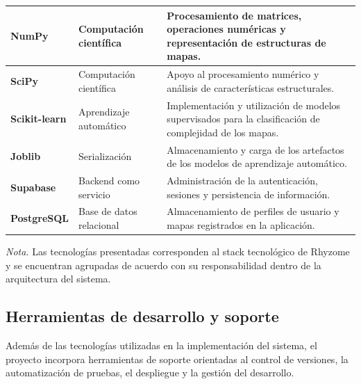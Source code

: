 \begin{table}[htbp]
\begin{tabularx}{\textwidth}{
			|>{\raggedright\arraybackslash}p{2.8cm}|
			>{\raggedright\arraybackslash}p{2.8cm}|
			>{\raggedright\arraybackslash}X|
		}
		\hline
		
		\textbf{NumPy} &
		Computación científica &
		Procesamiento de matrices, operaciones numéricas y representación de estructuras de mapas. \\
		
		\hline
		
		\textbf{SciPy} &
		Computación científica &
		Apoyo al procesamiento numérico y análisis de características estructurales. \\
		
		\hline
		
		\textbf{Scikit-learn} &
		Aprendizaje automático &
		Implementación y utilización de modelos supervisados para la clasificación de complejidad de los mapas. \\
		
		\hline
		
		\textbf{Joblib} &
		Serialización &
		Almacenamiento y carga de los artefactos de los modelos de aprendizaje automático. \\
		
		\hline
		
		\textbf{Supabase} &
		Backend como servicio &
		Administración de la autenticación, sesiones y persistencia de información. \\
		
		\hline
		
		\textbf{PostgreSQL} &
		Base de datos relacional &
		Almacenamiento de perfiles de usuario y mapas registrados en la aplicación. \\
		
		\hline
		
	\end{tabularx}
	
	\par\smallskip
	\raggedright
	
	\textit{Nota.} Las tecnologías presentadas corresponden al stack tecnológico de Rhyzome y se encuentran agrupadas de acuerdo con su responsabilidad dentro de la arquitectura del sistema.
	
\end{table}

\FloatBarrier

\subsection{Herramientas de desarrollo y soporte}

Además de las tecnologías utilizadas en la implementación del sistema, el proyecto incorpora herramientas de soporte orientadas al control de versiones, la automatización de pruebas, el despliegue y la gestión del desarrollo.

